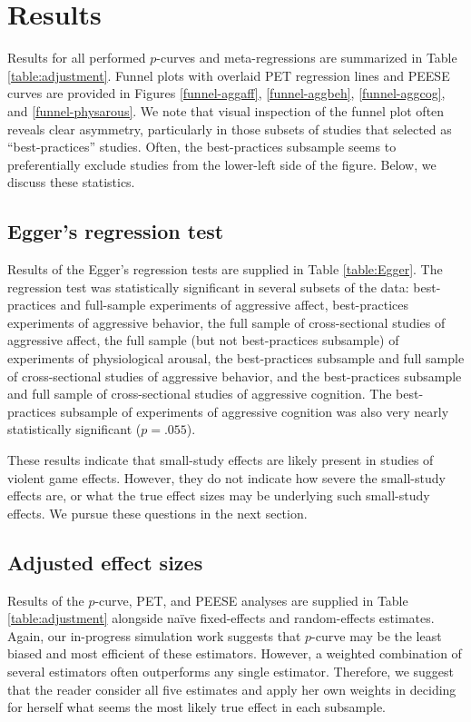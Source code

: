 \documentclass[man]{apa6}
\begin{document}
\section{Results}
Results for all performed $p$-curves and meta-regressions are summarized in Table \ref{table:adjustment}. 
Funnel plots with overlaid PET regression lines and PEESE curves are provided in Figures \ref{funnel-aggaff}, \ref{funnel-aggbeh}, \ref{funnel-aggcog}, and \ref{funnel-physarous}. We note that visual inspection of the funnel plot often reveals clear asymmetry, particularly in those subsets of studies that \citet{Anderson:etal:2010} selected as ``best-practices'' studies. Often, the best-practices subsample seems to preferentially exclude studies from the lower-left side of the figure.
Below, we discuss these statistics.%

\subsection{Egger's regression test}
Results of the Egger's regression tests are supplied in Table \ref{table:Egger}. The regression test was statistically significant in several subsets of the data: best-practices and full-sample experiments of aggressive affect, best-practices experiments of aggressive behavior, the full sample of cross-sectional studies of aggressive affect, the full sample (but not best-practices subsample) of experiments of physiological arousal, the best-practices subsample and full sample of cross-sectional studies of aggressive behavior, and the best-practices subsample and full sample of cross-sectional studies of aggressive cognition. The best-practices subsample of experiments of aggressive cognition was also very nearly statistically significant ($p = .055$).

These results indicate that small-study effects are likely present in studies of violent game effects. However, they do not indicate how severe the small-study effects are, or what the true effect sizes may be underlying such small-study effects. We pursue these questions in the next section.

\subsection{Adjusted effect sizes}
Results of the $p$-curve, PET, and PEESE analyses are supplied in Table \ref{table:adjustment} alongside na{\"i}ve fixed-effects and random-effects estimates. Again, our in-progress simulation work suggests that $p$-curve may be the least biased and most efficient of these estimators. However, a weighted combination of several estimators often outperforms any single estimator. Therefore, we suggest that the reader consider all five estimates and apply her own weights in deciding for herself what seems the most likely true effect in each subsample. 
\end{document}

